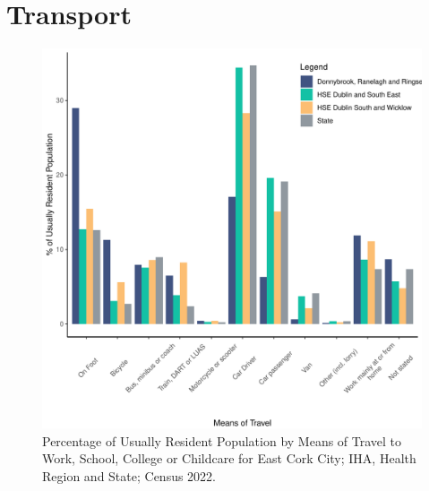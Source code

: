 \documentclass{article}
\begin{document}
\section{Transport}\label{sect:Trans}
\begin{figure}[H]
	\centering
	\includegraphics[width = 120mm]{../figures/TravelED.pdf}
	\caption{Percentage of Usually Resident Population by Means of Travel to Work, School, College or Childcare for East Cork City; IHA, Health Region and State; Census 2022.}
	\label{fig:vbnv}
	\end{figure}
\end{document}
